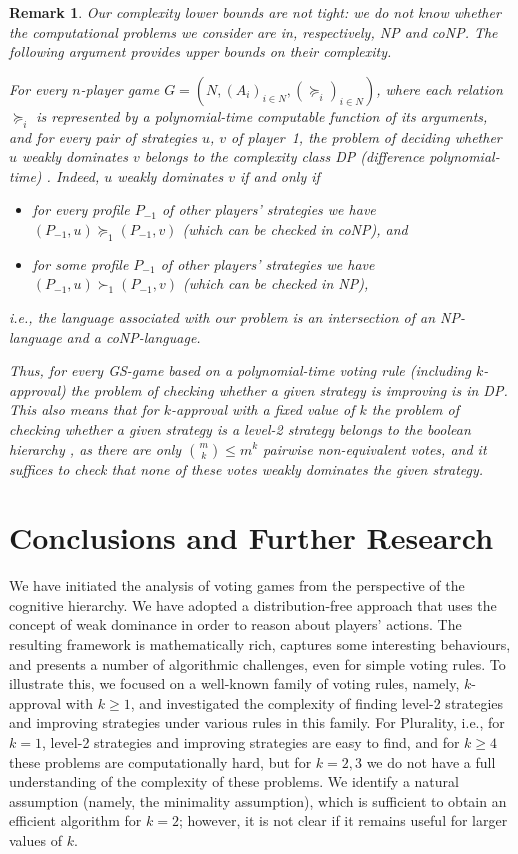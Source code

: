 \documentclass[11pt]{article}
\newtheorem{remark}{Remark}
\begin{document}
\begin{remark}
Our complexity lower bounds are not tight: we do not know whether the computational problems
we consider are in, respectively, {\em NP} and {\em coNP}. The following argument provides upper bounds 
on their complexity.

For every $n$-player game $G=(N, (A_i)_{i\in N}, (\succeq_i)_{i\in N})$, 
where each relation $\succeq_i$ is represented by a polynomial-time computable function of its arguments, and 
for every pair of strategies $u$, $v$ of player~1, the problem of deciding whether $u$ weakly dominates $v$ 
belongs to the complexity class {\em DP} (difference polynomial-time) \citep{PY84,Wechsung85}. 
Indeed, $u$ weakly dominates $v$ if and only if 
\begin{itemize}
\item[(a)] 
for every profile $P_{-1}$ of other players' strategies we have $(P_{-1}, u)\succeq_1 (P_{-1}, v)$
(which can be checked in {\em coNP}), and
\item[(b)] 
for some profile $P_{-1}$ of other players' strategies we have $(P_{-1}, u)\succ_1 (P_{-1}, v)$
(which can be checked in {\em NP}), 
\end{itemize}
i.e., the language associated with our problem is an intersection of an {\em NP}-language and a {\em coNP}-language.

Thus, for every GS-game based on a polynomial-time voting rule (including $k$-approval) the problem of checking whether a given
strategy is improving is in {\em DP}. This also means that
for $k$-approval with a fixed value of $k$ the problem
of checking whether a given strategy is a level-2 strategy belongs to the boolean hierarchy \citep{Wechsung85}, 
as there are only ${m\choose k}\le m^k$ pairwise non-equivalent votes, and 
it suffices to check that none of these votes weakly dominates the given strategy.
\end{remark}

\section{Conclusions and Further Research}\label{sec:conclusions}
We have initiated the analysis of voting games from the perspective of the cognitive hierarchy.
We have adopted a distribution-free approach that uses the concept of weak dominance in order
to reason about players' actions. The resulting framework is mathematically rich, captures some interesting behaviours, 
and presents a number of algorithmic challenges, even for simple voting rules. To illustrate this, we focused
on a well-known family of voting rules, namely, $k$-approval with $k\ge 1$, and investigated the complexity
of finding level-2 strategies and improving strategies under various rules in this family. For Plurality, i.e., for $k=1$, 
level-2 strategies and improving strategies are easy to find, and for $k\ge 4$ these problems are computationally hard, 
but for $k=2, 3$ we do not have a full understanding of the complexity of these problems. 
We identify a natural assumption (namely, the minimality assumption),
which is sufficient to obtain an efficient algorithm for $k=2$; however, it is 
not clear if it remains useful for larger values of $k$.
\end{document}
